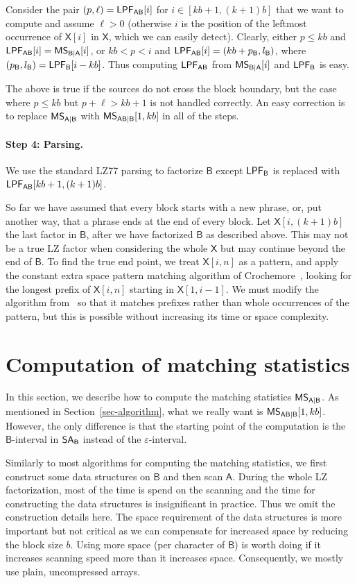 \documentclass[runningheads]{llncs}
\def\SA{\mbox{\rm {\sf SA}}}
\def\X{\textsf{X}}
\def\MS{\mbox{\rm {\sf MS}}}
\def\B{\textsf{B}}
\def\A{\textsf{A}}
\def\LPF{\mbox{\rm {\sf LPF}}}
\begin{document}
Consider the pair $(p,\ell)=\LPF_{\A\B}[i]$ for $i\in[kb+1,(k+1)b]$
that we want to compute and assume $\ell>0$ (otherwise $i$ is the position
of the leftmost occurrence of $\X[i]$ in $\X$, which we can easily detect).
Clearly, either $p\le kb$ and $\LPF_{\A\B}[i]=\MS_{\B|\A}[i]$, or $kb < p < i$
and $\LPF_{\A\B}[i]=(kb+p_{\B},l_{\B})$, where $(p_{\B},l_{\B})=\LPF_{\B}[i-kb]$.
Thus computing $\LPF_{\A\B}$ from
$\MS_{\B|\A}[i]$ and $\LPF_{\B}$ is easy. 

The above is true if the sources do not cross the block
boundary, but the case where $p\le kb$ but $p+\ell > kb+1$ is not
handled correctly. An easy correction is to replace $\MS_{\A|\B}$ with
$\MS_{\A\B|\B}[1,kb]$ in all of the steps. 

\paragraph{Step 4: Parsing.}

We use the standard LZ77 parsing to factorize $\B$ except
$\LPF_{\B}$ is replaced with $\LPF_{\A\B}[kb+1,(k+1)b]$.

So far we have assumed that every block starts with a new phrase, or,
put another way, that a phrase ends at the end of every block. Let
$\X[i,(k+1)b]$ the last factor in $\B$, after we have factorized $\B$
as described above. This may not be a true LZ factor when considering
the whole $\X$ but may continue beyond the end of $\B$.
To find
the true end point, we treat
$\X[i,n]$ as a pattern, and apply the constant
extra space pattern matching algorithm of Crochemore~\cite{c1992}, looking for
the longest prefix of $\X[i,n]$ starting in $\X[1,i-1]$. We must
modify the algorithm from~\cite{c1992} so that it matches prefixes
rather than whole occurrences of the pattern, but this is possible
without increasing its time or space
complexity.

\section{Computation of matching statistics}
\label{sec-ms}

In this section, we describe how to compute the matching statistics 
$\MS_{\A|\B}$. As mentioned in Section~\ref{sec-algorithm}, what 
we really want is $\MS_{\A\B|\B}[1,kb]$. However, the only difference
is that the starting point of the computation is the $\B$-interval in
$\SA_{\B}$ instead of the $\varepsilon$-interval.

Similarly to most algorithms for computing the matching statistics, 
we first construct some data structures on $\B$ and then scan
$\A$. During the whole LZ factorization, most of the time is spend on
the scanning and the time for constructing the data structures is
insignificant in practice. Thus we omit the construction details here.
The space requirement of the data structures is more important but not
critical as we can compensate for increased space by
reducing the block size $b$. Using more space (per character of $\B$)
is worth doing if it increases scanning speed more than it increases
space. Consequently, we mostly use plain, uncompressed
arrays.
\end{document}
